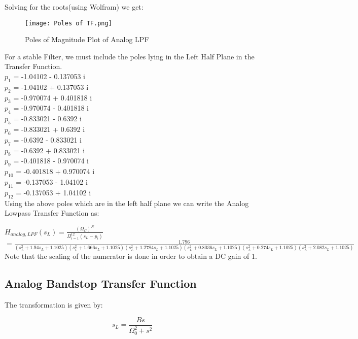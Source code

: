 \documentclass{article}
\begin{document}
Solving for the roots(using Wolfram) we get:

\begin{figure}[h!]

\centering
\texttt{[image: Poles of TF.png]}
\caption{Poles of Magnitude Plot of Analog LPF}
\end{figure}

For a stable Filter, we must include the
poles lying in the Left Half Plane in the Transfer Function.\\
$p_1$ = -1.04102 - 0.137053 i\\
$p_2$ = -1.04102 + 0.137053 i\\
$p_3$ = -0.970074 + 0.401818 i\\
$p_4$ = -0.970074 - 0.401818 i\\
$p_5$ = -0.833021 - 0.6392 i\\
$p_6$ = -0.833021 + 0.6392 i\\
$p_7$ = -0.6392 - 0.833021 i\\
$p_8$ = -0.6392 + 0.833021 i\\
$p_9$ = -0.401818 - 0.970074 i\\
$p_{10}$ = -0.401818 + 0.970074 i\\
$p_{11}$ = -0.137053 - 1.04102 i\\
$p_{12}$ = -0.137053 + 1.04102 i\\

Using the above poles which are in the left half plane we can write the Analog Lowpass Transfer Function as:



    

      $   H_{analog,LPF}(s_L) = \frac{(\Omega_C)^N}{\Pi_{i=1}^{12} (s_L-p_i)} $\\
     $ = \frac{1.796}{(s_L^2+1.94s_L+1.1025)(s_L^2+1.666s_L+1.1025)(s_L^2+1.2784s_L+1.1025)(s_L^2+0.8036s_L+1.1025)(s_L^2+0.274s_L+1.1025)(s_L^2+2.082s_L+1.1025)} $\\


    Note that the scaling of the numerator is done in order to obtain a DC gain of 1.

\subsection{Analog Bandstop Transfer Function}

The transformation is given by:
\vspace{-5mm}
\begin{center}
    \begin{equation*}
        s_L = \frac{Bs}{\Omega_0^2+s^2}
    \end{equation*}
\end{center}
\end{document}
